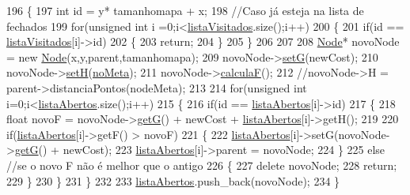 \begin{DoxyCode}
196 \{   
197     \textcolor{keywordtype}{int} \textcolor{keywordtype}{id} = y* tamanhomapa + x;
198     \textcolor{comment}{//Caso já esteja na lista de fechados}
199     \textcolor{keywordflow}{for}(\textcolor{keywordtype}{unsigned} \textcolor{keywordtype}{int} i =0;i<\hyperlink{classBusca__a_aa5749eb61eb84cb8eed28cab69a114cd}{listaVisitados}.size();i++)
200     \{
201         \textcolor{keywordflow}{if}(\textcolor{keywordtype}{id} == \hyperlink{classBusca__a_aa5749eb61eb84cb8eed28cab69a114cd}{listaVisitados}[i]->\textcolor{keywordtype}{id})
202         \{
203             \textcolor{keywordflow}{return};
204         \}
205     \}
206     
207 
208     \hyperlink{classNode}{Node}* novoNode = \textcolor{keyword}{new} \hyperlink{classNode}{Node}(x,y,parent,tamanhomapa);
209     novoNode->\hyperlink{classNode_ac269852dd9117461a6069589470c39f1}{setG}(newCost);
210     novoNode->\hyperlink{classNode_aa10f28d0b00917bc5106373c73eb636f}{setH}(\hyperlink{classBusca__a_ae9276b091e39db37bfef34dc0fa5c19b}{noMeta});
211     novoNode->\hyperlink{classNode_aedfbcdc45d98f312e507e34e18b26093}{calculaF}();
212     \textcolor{comment}{//novoNode->H = parent->distanciaPontos(nodeMeta);}
213 
214     \textcolor{keywordflow}{for}(\textcolor{keywordtype}{unsigned} \textcolor{keywordtype}{int} i=0;i<\hyperlink{classBusca__a_a75cdf1a045b9836fd8e61604846fa436}{listaAbertos}.size();i++)
215     \{
216         \textcolor{keywordflow}{if}(\textcolor{keywordtype}{id} == \hyperlink{classBusca__a_a75cdf1a045b9836fd8e61604846fa436}{listaAbertos}[i]->\textcolor{keywordtype}{id})
217         \{
218             \textcolor{keywordtype}{float} novoF = novoNode->\hyperlink{classNode_ab72b743b5abe69381e9066f4225793d2}{getG}() + newCost + \hyperlink{classBusca__a_a75cdf1a045b9836fd8e61604846fa436}{listaAbertos}[i]->getH();
219 
220             \textcolor{keywordflow}{if}(\hyperlink{classBusca__a_a75cdf1a045b9836fd8e61604846fa436}{listaAbertos}[i]->getF() > novoF)
221             \{
222                 \hyperlink{classBusca__a_a75cdf1a045b9836fd8e61604846fa436}{listaAbertos}[i]->setG(novoNode->\hyperlink{classNode_ab72b743b5abe69381e9066f4225793d2}{getG}() + newCost);
223                 \hyperlink{classBusca__a_a75cdf1a045b9836fd8e61604846fa436}{listaAbertos}[i]->parent = novoNode;
224             \}
225             \textcolor{keywordflow}{else} \textcolor{comment}{//se o novo F não é melhor que o antigo}
226             \{
227                 \textcolor{keyword}{delete} novoNode;
228                 \textcolor{keywordflow}{return};
229             \}
230         \}
231     \}
232 
233     \hyperlink{classBusca__a_a75cdf1a045b9836fd8e61604846fa436}{listaAbertos}.push\_back(novoNode);
234 \}
\end{DoxyCode}


